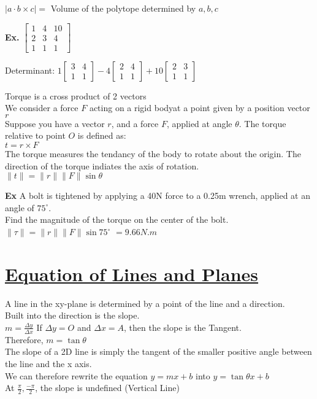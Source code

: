 \documentclass[]{article}
\title{\docTitle}
\author{\docAuthor}
\date{\today}
\begin{document}
\maketitle
$|a\cdot b\times c| = $ Volume of the polytope determined by $a, b, c$

\textbf{Ex.}
$
\begin{bmatrix}
    1&4&10\\
    2&3&4\\
    1&1&1
\end{bmatrix}
$

Determinant: $1 \begin{bmatrix} 3&4\\1&1\end{bmatrix}- 4\begin{bmatrix} 2&4\\1&1\end{bmatrix} + 10\begin{bmatrix}2&3\\1&1\end{bmatrix}$

Torque is a cross product of 2 vectors\\
We consider a force $F$ acting on a rigid bodyat a point given by a position vector $r$\\
Suppose you have a vector $r$, and a force $F$, applied at angle $\theta$. The torque relative to point $O$ is defined as:\\
$t = r \times F$\\
The torque measures the tendancy of the body to rotate about the origin. The direction of the torque indiates the axis of rotation.\\
$\|t\| = \|r\|\|F\|\sin\theta$

\textbf{Ex} A bolt is tightened by applying a 40N force to a 0.25m wrench, applied at an angle of $75^{\circ}$.\\
Find the magnitude of the torque on the center of the bolt.\\
$\|\tau\|=\|r\|\|F\|\sin{75^{\circ}}$
$= 9.66 N.m$


\section{\underline{Equation of Lines and Planes}}
A line in the xy-plane is determined by a point of the line and a direction.\\
\hspace*{0.5in} Built into the direction is the slope.\\
$m = \frac{\Delta y}{\Delta x}$
If $\Delta y = O$ and $\Delta x = A$, then the slope is the Tangent.\\
Therefore, $m = \tan{\theta}$\\
The slope of a 2D line is simply the tangent of the smaller positive angle between the line and the x axis.\\
We can therefore rewrite the equation $y = mx + b$ into $y = \tan{\theta}x + b$\\
At $\frac{\pi}{2}, \frac{-\pi}{2}$, the slope is undefined (Vertical Line)\\
\end{document}
